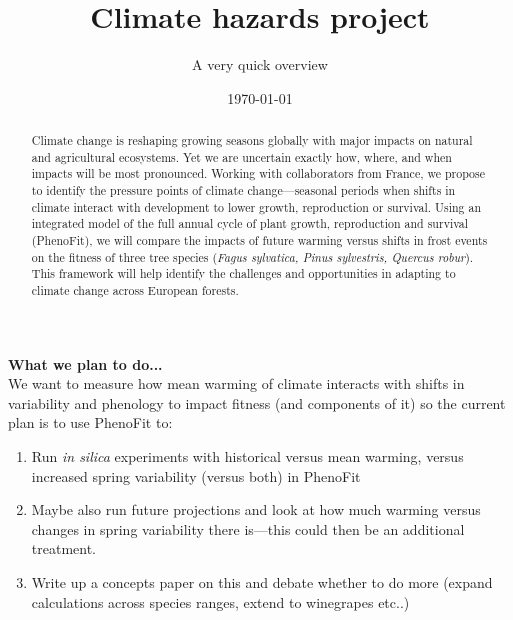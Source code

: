 \documentclass[11pt,letter]{article}
\begin{document}

\renewcommand{\refname}{\CHead{}}
\title{Climate hazards project}
\author{A very quick overview} %
\date{\today}
\maketitle

\begin{abstract}
Climate change is reshaping growing seasons globally with major impacts on natural and agricultural ecosystems. Yet we are uncertain exactly how, where, and when impacts will be most pronounced. Working with collaborators from France, we propose  to identify the pressure points of climate change---seasonal periods when shifts in climate interact with development to lower growth, reproduction or survival. Using an integrated model of the full annual cycle of plant growth, reproduction and survival (PhenoFit), we will compare the impacts of future warming versus shifts in frost events on the fitness of three tree species (\emph{Fagus sylvatica, Pinus sylvestris, Quercus robur}). This framework will help identify the challenges and opportunities in adapting to climate change across European forests. 
\end{abstract}

{\bf What we plan to do...}\\

We want to measure how mean warming of climate interacts with shifts in variability and phenology to impact fitness (and components of it) so the current plan is to use PhenoFit to:
\begin{enumerate}
\item Run \emph{in silica} experiments with historical versus mean warming, versus increased spring variability (versus both) in PhenoFit
\item Maybe also run future projections and look at how much warming versus changes in spring variability there is---this could then be an additional treatment. 
\item Write up a concepts paper on this and debate whether to do more (expand calculations across species ranges, extend to winegrapes etc..)
\end{enumerate}
\end{document}
